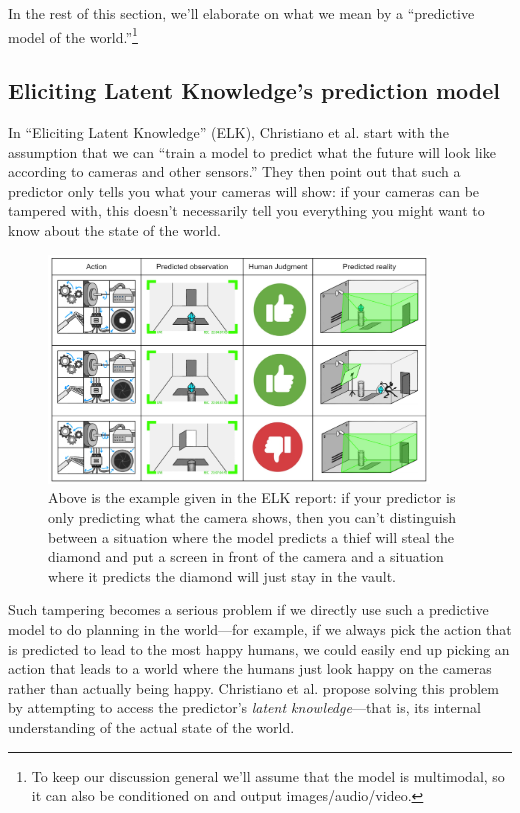 \documentclass[
  onecolumn,
  nonatbib,
]{miri-tech-article}
\begin{document}
In the rest of this section, we'll elaborate on what we mean by a ``predictive model of the world.''\footnote{To keep our discussion general we'll assume that the model is multimodal, so it can also be conditioned on and output images/audio/video.}


\subsection{Eliciting Latent Knowledge's prediction model}\label{subsec:elk_prediction_model}

In ``Eliciting Latent Knowledge\cite{elk}'' (ELK), Christiano et al. start with the assumption that we can ``train a model to predict what the future will look like according to cameras and other sensors.'' They then point out that such a predictor only tells you what your cameras will show: if your cameras can be tampered with, this doesn't necessarily tell you everything you might want to know about the state of the world.

\begin{figure}[h!]
  \centering
  \includegraphics[width=0.9\textwidth]{V6aklBz.png}
  \caption{Above is the example given in the ELK report: if your predictor is only predicting what the camera shows, then you can't distinguish between a situation where the model predicts a thief will steal the diamond and put a screen in front of the camera and a situation where it predicts the diamond will just stay in the vault.}
\end{figure}

Such tampering becomes a serious problem if we directly use such a predictive model to do planning in the world---for example, if we always pick the action that is predicted to lead to the most happy humans, we could easily end up picking an action that leads to a world where the humans just look happy on the cameras rather than actually being happy. Christiano et al. propose solving this problem by attempting to access the predictor's \textit{latent knowledge}---that is, its internal understanding of the actual state of the world.
\end{document}
